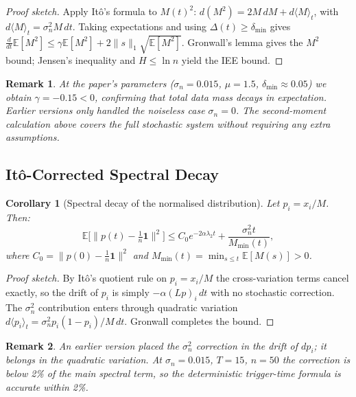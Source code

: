 \documentclass[conference]{IEEEtran}
\newcommand{\lambdat}{\lambda_2}
\newtheorem{corollary}{Corollary}
\newtheorem{remark}{Remark}
\begin{document}
\begin{proof}[Proof sketch]
Apply It\^{o}'s formula to $M(t)^2$:
$d(M^2)=2M\,dM+d\langle M\rangle_t$,
with $d\langle M\rangle_t=\sigma_n^2 M\,dt$.
Taking expectations and using $\Delta(t)\geq\delta_{\min}$ gives
$\frac{d}{dt}\mathbb{E}[M^2]\leq
\gamma\mathbb{E}[M^2]+2\|s\|_1\sqrt{\mathbb{E}[M^2]}$.
Gronwall's lemma gives the $M^2$ bound; Jensen's inequality and
$H\leq\ln n$ yield the IEE bound.
\end{proof}

\begin{remark}
At the paper's parameters ($\sigma_n=0.015$, $\mu=1.5$,
$\delta_{\min}\approx 0.05$) we obtain $\gamma=-0.15<0$, confirming
that total data mass decays in expectation.  Earlier versions only handled the noiseless case $\sigma_n=0$.
The second-moment calculation above covers the full stochastic
system without requiring any extra assumptions.
\end{remark}

\subsection{It\^{o}-Corrected Spectral Decay}

\begin{corollary}[Spectral decay of the normalised distribution]
\label{cor:spectral}
Let $p_i=x_i/M$.  Then:
\begin{equation}
  \mathbb{E}\bigl[\|p(t)-\tfrac{1}{n}\mathbf{1}\|^2\bigr]
  \leq C_0 e^{-2\alpha\lambdat t}
  +\frac{\sigma_n^2 t}{M_{\min}(t)},
\end{equation}
where $C_0=\|p(0)-\frac{1}{n}\mathbf{1}\|^2$ and
$M_{\min}(t)=\min_{s\leq t}\mathbb{E}[M(s)]>0$.
\end{corollary}

\begin{proof}[Proof sketch]
By It\^{o}'s quotient rule on $p_i=x_i/M$ the cross-variation
terms cancel exactly, so the drift of $p_i$ is simply
$-\alpha(Lp)_i\,dt$ with no stochastic correction.  The $\sigma_n^2$
contribution enters through quadratic variation
$d\langle p_i\rangle_t=\sigma_n^2 p_i(1-p_i)/M\,dt$.
Gronwall completes the bound.
\end{proof}

\begin{remark}
An earlier version placed the $\sigma_n^2$ correction in the drift
of $dp_i$; it belongs in the quadratic variation.  At
$\sigma_n=0.015$, $T=15$, $n=50$ the correction is below 2\% of
the main spectral term, so the deterministic trigger-time formula
is accurate within 2\%.
\end{remark}
\end{document}

